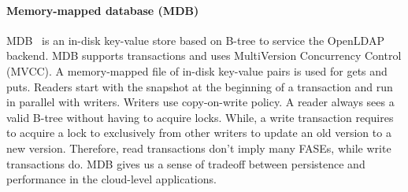 \documentclass[preprint,nocopyrightspace,10pt]{sigplanconf}
\begin{document}
\paragraph{Memory-mapped database (MDB)}
MDB~\cite{Chu:2014} is an in-disk key-value store based on B-tree to service
the OpenLDAP~\cite{OpenLDAP} backend. MDB supports transactions and uses MultiVersion
Concurrency Control (MVCC). A memory-mapped file of in-disk key-value pairs 
is used for gets and puts. Readers start with the snapshot at the beginning of a 
transaction and run in parallel with writers. Writers use copy-on-write policy. 
A reader always sees a valid B-tree without having to acquire locks. While,
a write transaction requires to acquire a lock to exclusively from other writers
to update an old version to a new version. Therefore, read transactions
don't imply many FASEs, while write transactions do. MDB gives us a sense 
of tradeoff between persistence and performance in the cloud-level applications.
\end{document}
